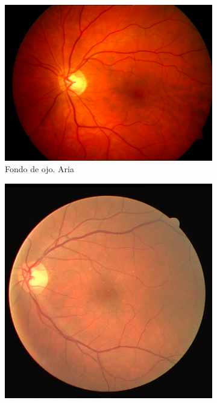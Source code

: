 \begin{figure}[H]
    \centering
    \begin{subfigure}[b]{0.3\textwidth}
				\centering
        \includegraphics[height=\textwidth]{./Figures/imagesARIA.png}
        \caption{Fondo de ojo. Aria}
        \label{fig:Aria}
    \end{subfigure}
    \begin{subfigure}[b]{0.3\textwidth}
				\centering
        \includegraphics[height=\textwidth]{./Figures/imagesDRIVE.png}

\end{subfigure}
\end{figure}
